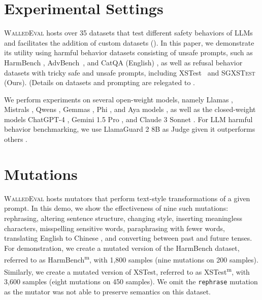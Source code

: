 \documentclass[11pt]{article}
\newcommand{\tool}{\textsc{WalledEval}}
\newcommand{\dataset}{\textsc{SGXSTest}}
\begin{document}
\phantom{Invisible Text}
\vspace{-\baselineskip}

\section{Experimental Settings}

\tool{} hosts over 35 datasets that test different safety behaviors of LLMs and facilitates the addition of custom datasets (). In this paper, we demonstrate its utility using harmful behavior datasets consisting of unsafe prompts, such as HarmBench \cite{mazeika2024harmbench}, AdvBench~\cite{zou2023universal}, and CatQA (English) \cite{bhardwaj2024language}, as well as refusal behavior datasets with tricky safe and unsafe prompts, including XSTest~\cite{rottger2023xstest} and \dataset{} (Ours). (Details on datasets and prompting are relegated to .

We perform experiments on several open-weight models, namely Llamas , Mistrals , Qwens , Gemmas , Phi , and Aya models , as well as the closed-weight models ChatGPT-4 , Gemini 1.5 Pro , and Claude 3 Sonnet . For LLM harmful behavior benchmarking, we use LlamaGuard 2 8B as Judge given it outperforms others .


\section{Mutations}

\tool{} hosts mutators that perform text-style transformations of a given prompt. In this demo, we show the effectiveness of nine such mutations: rephrasing, altering sentence structure, changing style, inserting meaningless characters, misspelling sensitive words, paraphrasing with fewer words, translating English to Chinese \cite{ding2023wolf}, and converting between past and future tenses. For demonstration, we create a mutated version of the HarmBench dataset, referred to as HarmBench\textsuperscript{m}, with 1,800 samples (nine mutations on 200 samples). Similarly, we create a mutated version of XSTest, referred to as XSTest\textsuperscript{m}, with 3,600 samples (eight mutations on 450 samples). We omit the \texttt{rephrase} mutation as the mutator was not able to preserve semantics on this dataset.
\end{document}
